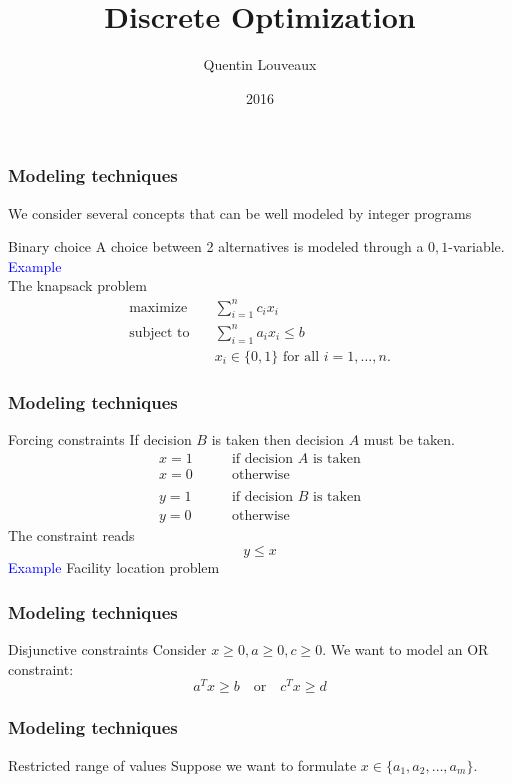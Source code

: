 \documentclass[9pt]{beamer}
\title{Discrete Optimization}
\author{Quentin
Louveaux}
\institute{ULg - Institut Montefiore}
\date{2016}
\begin{document}
\begin{frame}
  \titlepage
\end{frame}
\begin{frame}
\frametitle{Modeling techniques}
We consider several concepts that can be well modeled
by \alert{integer programs}
\begin{block}{Binary choice}
A \alert{choice} between 2 alternatives is modeled through a 
$0,1$-variable.\\
\textcolor{blue}{Example}\\
The \alert{knapsack problem}
\begin{align*}
\text{maximize}\quad & \sum_{i=1}^n c_i x_i\\
\text{subject to}\quad& \sum_{i=1}^n a_i x_i \leq b\\
& x_i\in \{0,1\}\text{ for all }i=1,\ldots,n.
\end{align*}
\end{block}
\end{frame}
\begin{frame}
\frametitle{Modeling techniques}
\begin{block}{Forcing constraints}
\alert{If} decision $B$ is taken \alert{then} decision $A$ must be taken.
\begin{align*}
x=1\qquad & \text{if decision $A$ is taken}\\
x=0\qquad & \text{otherwise}\\
\\
y=1\qquad & \text{if decision $B$ is taken}\\
y=0\qquad & \text{otherwise}
\end{align*}
The constraint reads
\alert{$$y\leq x$$}
\textcolor{blue}{Example} Facility location problem
\end{block}
\end{frame}
\begin{frame}
\frametitle{Modeling techniques}
\begin{block}{Disjunctive constraints}
Consider $x\geq 0, a\geq 0, c\geq 0$.
We want to model an \alert{OR} constraint:
$$ a^T x \geq b \quad \text{or}\quad c^Tx \geq d $$
\end{block}
\end{frame}
\begin{frame}
\frametitle{Modeling techniques}
\begin{block}{Restricted range of values}
Suppose we want to formulate $x\in \{a_1,a_2,\ldots, a_m\}$.\bigskip

\end{block}
\end{frame}
\end{document}
